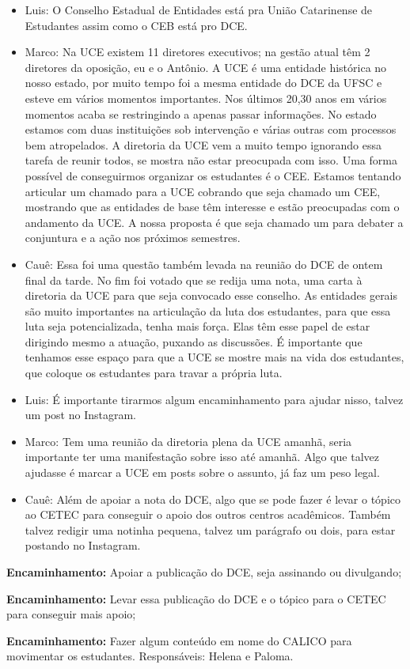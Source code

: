 \documentclass{ata-calico}
\begin{document}
\begin{itemize}
\item Luis: O Conselho Estadual de Entidades está pra União Catarinense de Estudantes assim como o CEB está pro DCE.
\item Marco: Na UCE existem 11 diretores executivos; na gestão atual têm 2 diretores da oposição, eu e o Antônio. A UCE é uma entidade histórica no nosso estado, por muito tempo foi a mesma entidade do DCE da UFSC e esteve em vários momentos importantes. Nos últimos 20,30 anos em vários momentos acaba se restringindo a apenas passar informações. No estado estamos com duas instituições sob intervenção e várias outras com processos bem atropelados. A diretoria da UCE vem a muito tempo ignorando essa tarefa de reunir todos, se mostra não estar preocupada com isso. Uma forma possível de conseguirmos organizar os estudantes é o CEE. Estamos tentando articular um chamado para a UCE cobrando que seja chamado um CEE, mostrando que as entidades de base têm interesse e estão preocupadas com o andamento da UCE. A nossa proposta é que seja chamado um para debater a conjuntura e a ação nos próximos semestres.
\item Cauê: Essa foi uma questão também levada na reunião do DCE de ontem final da tarde. No fim foi votado que se redija uma nota, uma carta à diretoria da UCE para que seja convocado esse conselho. As entidades gerais são muito importantes na articulação da luta dos estudantes, para que essa luta seja potencializada, tenha mais força. Elas têm esse papel de estar dirigindo mesmo a atuação, puxando as discussões. É importante que tenhamos esse espaço para que a UCE se mostre mais na vida dos estudantes, que coloque os estudantes para travar a própria luta.
\item Luis: É importante tirarmos algum encaminhamento para ajudar nisso, talvez um post no Instagram.
\item Marco: Tem uma reunião da diretoria plena da UCE amanhã, seria importante ter uma manifestação sobre isso até amanhã. Algo que talvez ajudasse é marcar a UCE em posts sobre o assunto, já faz um peso legal.
\item Cauê: Além de apoiar a nota do DCE, algo que se pode fazer é levar o tópico ao CETEC para conseguir o apoio dos outros centros acadêmicos. Também talvez redigir uma notinha pequena, talvez um parágrafo ou dois, para estar postando no Instagram.
\end{itemize}

\textbf{Encaminhamento:} Apoiar a publicação do DCE, seja assinando ou divulgando;

\textbf{Encaminhamento:} Levar essa publicação do DCE e o tópico para o CETEC para conseguir mais apoio;

\textbf{Encaminhamento:} Fazer algum conteúdo em nome do CALICO para movimentar os estudantes. Responsáveis: Helena e Paloma.

\end{document}
